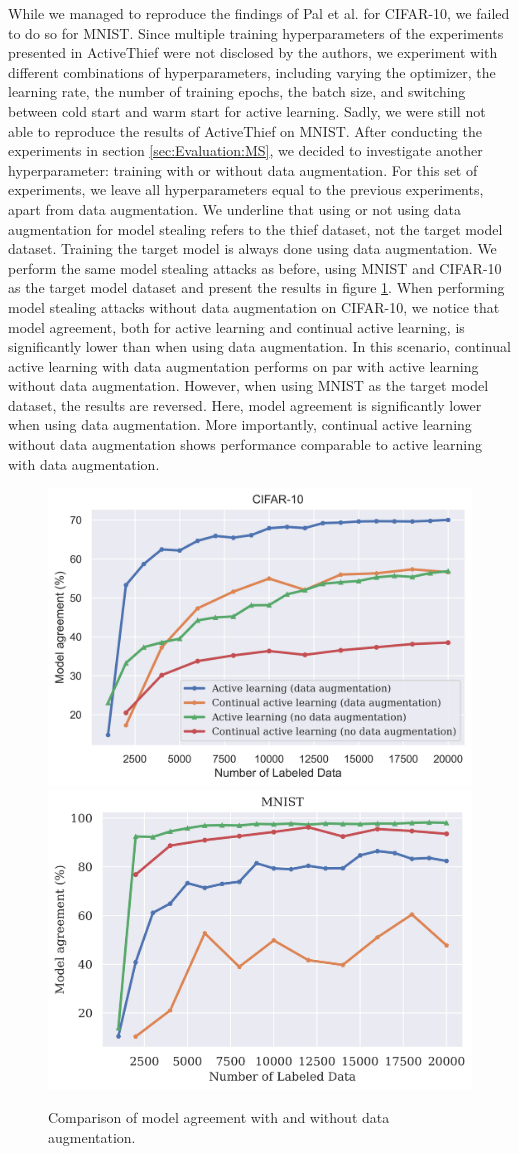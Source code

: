 While we managed to reproduce the findings of Pal et al. for CIFAR-10, we failed to do so for MNIST. Since multiple training hyperparameters of the experiments
presented in ActiveThief were not disclosed by the authors, we experiment with different combinations of hyperparameters, including varying the optimizer,
the learning rate, the number of training epochs, the batch size, and switching between cold start and warm start for active learning. Sadly, we were still
not able to reproduce the results of ActiveThief on MNIST. After conducting the experiments in section \ref{sec:Evaluation:MS}, we decided to investigate
another hyperparameter: training with or without data augmentation. For this set of experiments, we leave all hyperparameters equal to the previous experiments,
apart from data augmentation. We underline that using or not using data augmentation for model stealing refers to the thief dataset, not the target
model dataset. Training the target model is always done using data augmentation. We perform the same model stealing attacks as before, using MNIST and
CIFAR-10 as the target model dataset and present the results in figure \ref{fig:Evaluation:Results:CAL:EffectAugmentation}. When performing model stealing attacks
without data augmentation on CIFAR-10, we notice that model agreement, both for active learning and continual active learning, is significantly lower than
when using data augmentation. In this scenario, continual active learning with data augmentation performs on par with active learning without data augmentation.
However, when using MNIST as the target model dataset, the results are reversed. Here, model agreement is significantly lower when using data augmentation.
More importantly, continual active learning without data augmentation shows performance comparable to active learning with data augmentation. \par

\begin{figure}[!htb]
    \centering
    \includegraphics[width=0.48\linewidth]{images/results_CALMS/data_augmentation_cifar.png} \hfill
    \includegraphics[width=0.48\linewidth]{images/results_CALMS/data_augmentation_mnist.png}
    \caption{Comparison of model agreement with and without data augmentation.}
    \label{fig:Evaluation:Results:CAL:EffectAugmentation}
\end{figure}

